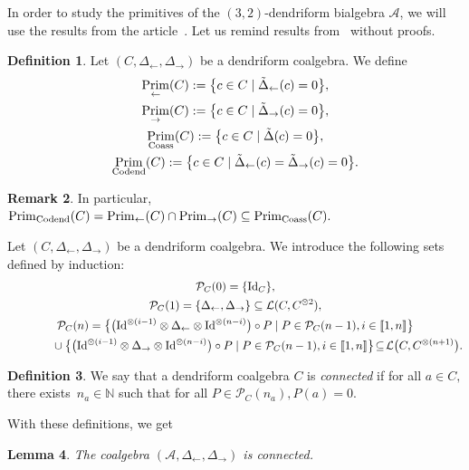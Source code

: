 \documentclass[pdftex]{sigma}
\numberwithin{equation}{section}
\theoremstyle{definition}
\newtheorem{defi}{Definition}[section]
\newtheorem{Rq}[defi]{Remark}
\theoremstyle{plain}
\newtheorem{Lemme}[defi]{Lemma}
\newcommand{\IEM}[2]{\llbracket #1,#2 \rrbracket}
\newcommand{\N}{\mathbb{N}}
\DeclareMathOperator{\Prim}{Prim}
\begin{document}
In order to study the primitives of the $(3,2)$-dendriform bialgebra $\mathcal{A}$, we will use the results from the article~\cite{bidend}. Let us remind results from~\cite{bidend} without proofs.

\begin{defi}
	Let $(C,\Delta_{\leftarrow},\Delta_{\rightarrow})$ be a dendriform coalgebra. We define
	\begin{gather*}
		\Prim_{\leftarrow}(C) :=\big\{ c\in C \mid \tilde{\Delta}_{\leftarrow}(c)=0 \big\}, \\
		\Prim_{\rightarrow}(C) :=\big\{ c\in C \mid \tilde{\Delta}_{\rightarrow}(c)=0 \big\}, \\
		\Prim_{\rm Coass}(C) :=\big\{ c\in C \mid \tilde{\Delta}(c)=0 \big\},\\
		\Prim_{\rm Codend}(C) :=\big\{ c\in C \mid \tilde{\Delta}_{\leftarrow}(c)=\tilde{\Delta}_{\rightarrow}(c)=0 \big\}.
	\end{gather*}
\end{defi}

\begin{Rq}
	In particular, $\Prim_{\rm Codend}(C)=\Prim_{\leftarrow}(C)\cap \Prim_{\rightarrow}(C)\subseteq\Prim_{\rm Coass}(C).$
\end{Rq}
Let $(C,\Delta_{\leftarrow},\Delta_{\rightarrow})$ be a dendriform coalgebra. We introduce the following sets defined by induction:
	\begin{gather*}
		\mathcal{P}_C(0)=\{{\rm Id}_C\}, \\
		\mathcal{P}_C(1)=\{\Delta_{\leftarrow},\Delta_{\rightarrow}\}\subseteq \mathcal{L}(C,C^{\otimes 2}), \\
		\mathcal{P}_C(n)=\big\lbrace \big( {\rm Id}^{\otimes(i-1)}\otimes \Delta_{\leftarrow} \otimes {\rm Id}^{\otimes (n-i)} \big)\circ P \mid P\in\mathcal{P}_C(n-1), i\in\IEM{1}{n} \big\rbrace \\
		 \hphantom{\mathcal{P}_C(n)=}{}\cup \big\lbrace \big( {\rm Id}^{\otimes(i-1)}\otimes \Delta_{\rightarrow} \otimes {\rm Id}^{\otimes (n-i)} \big)\circ P \mid P\in\mathcal{P}_C(n-1), i\in\IEM{1}{n} \big\rbrace \! \subseteq\! \mathcal{L}\big(C,C^{\otimes (n+1)}\big).
	\end{gather*}
\begin{defi}
	We say that a dendriform coalgebra $C$ is \emph{connected} if for all $a\in C,$ there exists~$n_a\in\N$ such that for all $P\in\mathcal{P}_C(n_a), P(a)=0.$
\end{defi}

{\samepage With these definitions, we get
\begin{Lemme}
	The coalgebra $(\mathcal{A},\Delta_{\leftarrow},\Delta_{\rightarrow})$ is connected.
\end{Lemme}

}
\end{document}
